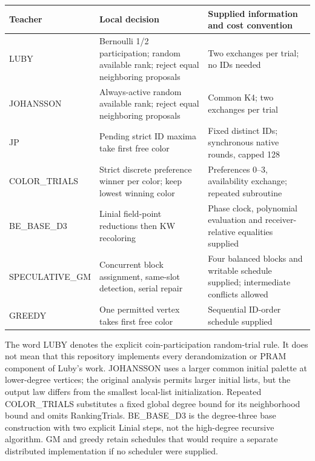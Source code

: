 \documentclass[
  11pt,
]{article}
\newcounter{none} %
\begin{document}
{\def\LTcaptype{none} %
\begin{longtable}[]{@{}
  >{\raggedright\arraybackslash}p{}
  >{\raggedright\arraybackslash}p{}
  >{\raggedright\arraybackslash}p{}@{}}
\toprule\noalign{}
\begin{minipage}[b]{\linewidth}\raggedright
Teacher
\end{minipage} & \begin{minipage}[b]{\linewidth}\raggedright
Local decision
\end{minipage} & \begin{minipage}[b]{\linewidth}\raggedright
Supplied information and cost convention
\end{minipage} \\
\midrule\noalign{}
\endhead
\bottomrule\noalign{}
\endlastfoot
LUBY & Bernoulli 1/2 participation; random available rank; reject equal
neighboring proposals & Two exchanges per trial; no IDs needed \\
JOHANSSON & Always-active random available rank; reject equal
neighboring proposals & Common K4; two exchanges per trial \\
JP & Pending strict ID maxima take first free color & Fixed distinct
IDs; synchronous native rounds, capped 128 \\
COLOR\_TRIALS & Strict discrete preference winner per color; keep lowest
winning color & Preferences 0--3, availability exchange; repeated
subroutine \\
BE\_BASE\_D3 & Linial field-point reductions then KW recoloring & Phase
clock, polynomial evaluation and receiver-relative equalities
supplied \\
SPECULATIVE\_GM & Concurrent block assignment, same-slot detection,
serial repair & Four balanced blocks and writable schedule supplied;
intermediate conflicts allowed \\
GREEDY & One permitted vertex takes first free color & Sequential
ID-order schedule supplied \\
\end{longtable}
}

The word LUBY denotes the explicit coin-participation random-trial rule.
It does not mean that this repository implements every derandomization
or PRAM component of Luby's work. JOHANSSON uses a larger common initial
palette at lower-degree vertices; the original analysis permits larger
initial lists, but the output law differs from the smallest local-list
initialization. Repeated COLOR\_TRIALS substitutes a fixed global degree
bound for its neighborhood bound and omits RankingTrials. BE\_BASE\_D3
is the degree-three base construction with two explicit Linial steps,
not the high-degree recursive algorithm. GM and greedy retain schedules
that would require a separate distributed implementation if no scheduler
were supplied.
\end{document}
